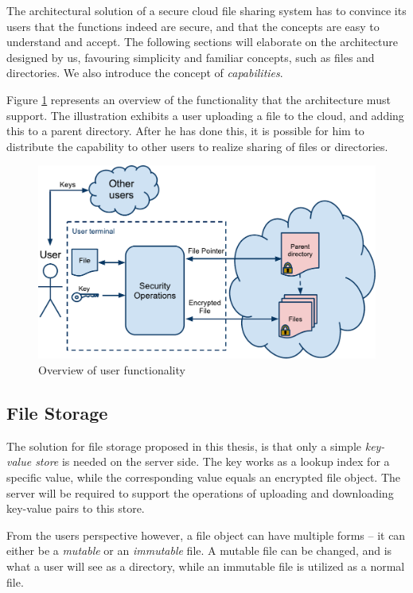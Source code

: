\documentclass[pdftex,english,10pt,b5paper,twoside]{book}
\begin{document}
The architectural solution of a secure cloud file sharing system has to
convince its users that the functions indeed are secure, and that the concepts
are easy to understand and accept. The following sections will elaborate on the
architecture designed by us, favouring simplicity and familiar concepts, such
as files and directories. We also introduce the concept of \emph{capabilities}.

Figure \ref{fig:AS:overview} represents an overview of the functionality that
the architecture must support. The illustration exhibits a user uploading a
file to the cloud, and adding this to a parent directory. After he has done
this, it is possible for him to distribute the capability to other users to
realize sharing of files or directories.

\begin{figure}[h!]
    \centering
    \includegraphics[width=\columnwidth]{ArchitectureOverview.pdf}
    \caption{Overview of user functionality}
    \label{fig:AS:overview}
\end{figure}

\subsection{File Storage}
\label{sec:AS:FS}

The solution for file storage proposed in this thesis, is that only a simple
\emph{key-value store} is needed on the server side. The key works as a lookup
index for a specific value, while the corresponding value equals an encrypted
file object. The server will be required to support the operations of uploading
and downloading key-value pairs to this store.

From the users perspective however, a file object can have multiple forms -- it
can either be a \emph{mutable} or an \emph{immutable} file. A mutable file can
be changed, and is what a user will see as a directory, while an immutable file
is utilized as a normal file.
\end{document}

